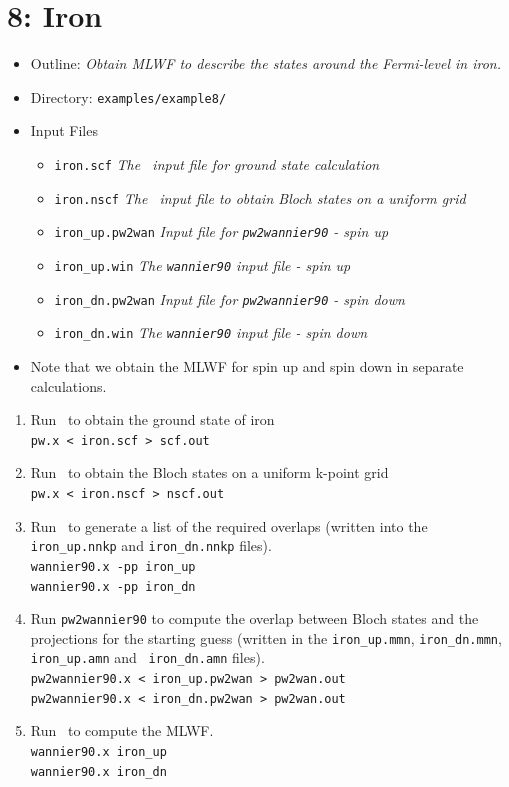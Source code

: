 \documentclass[a4paper,11pt,twoside]{article}
\begin{document}
\cleardoublepage

\section*{8: Iron}
\begin{itemize}
\item{Outline: \it{Obtain MLWF to describe the states around the
    Fermi-level in iron.}} 
\item{Directory: {\tt examples/example8/}}
\item{Input Files}
\begin{itemize}
\item{ {\tt iron.scf}  {\it The \pwscf\ input file for ground state
    calculation}} 
\item{ {\tt iron.nscf}  {\it The \pwscf\ input file to obtain Bloch states
    on a uniform grid}} 
\item{ {\tt iron\_up.pw2wan}  {\it Input file for {\tt pw2wannier90} -
    spin up}} 
\item{ {\tt iron\_up.win}  {\it The {\tt wannier90} input file - spin up}}
\item{ {\tt iron\_dn.pw2wan}  {\it Input file for {\tt pw2wannier90} -
    spin down}} 
\item{ {\tt iron\_dn.win}  {\it The {\tt wannier90} input file - spin down}}
\end{itemize}
\item{Note that we obtain the MLWF for spin up and spin down in
  separate calculations.} 
\end{itemize}

\begin{enumerate}
\item Run \pwscf\ to obtain the ground state of iron\\
{\tt pw.x < iron.scf > scf.out}

\item Run \pwscf\ to obtain the Bloch states on a uniform k-point grid\\
{\tt pw.x < iron.nscf > nscf.out}

\item Run \wannier\ to generate a list of the required overlaps (written
  into the {\tt iron\_up.nnkp} and {\tt iron\_dn.nnkp} files).\\
{\tt wannier90.x -pp iron\_up}\\
{\tt wannier90.x -pp iron\_dn}

\item Run {\tt pw2wannier90} to compute the overlap between Bloch
  states and the projections for the starting guess (written in the
  {\tt iron\_up.mmn}, {\tt iron\_dn.mmn}, {\tt iron\_up.amn} and {\tt
  iron\_dn.amn} files).\\ 
{\tt pw2wannier90.x < iron\_up.pw2wan > pw2wan.out}\\
{\tt pw2wannier90.x < iron\_dn.pw2wan > pw2wan.out}

\item Run \wannier\ to compute the MLWF.\\
{\tt wannier90.x iron\_up}\\
{\tt wannier90.x iron\_dn}
\end{enumerate}
\end{document}
